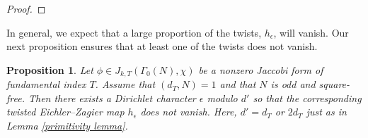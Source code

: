 \documentclass[11pt]{article}
\newtheorem{proposition}[theorem]{Proposition}
\theoremstyle{definition}
\theoremstyle{remark}
\newcommand{\Z}{\mathbb{Z}}
\begin{document}
\begin{proof}







\end{proof}

In general, we expect that a large proportion of the twists, $h_\epsilon$, will vanish. Our next proposition ensures that at least one of the twists does not vanish. 

\begin{proposition} \label{nonvanishing of twist}
    Let $\phi \in J_{k,T}(\Gamma_0(N),\chi)$ be a nonzero Jaccobi form of fundamental index $T$. Assume that $(d_T,N) = 1$ and that $N$ is odd and square-free. Then there exists a Dirichlet character $\epsilon$ modulo $d'$ so that the corresponding twisted Eichler--Zagier map $h_\epsilon$ does not vanish. Here, $d' = d_T$ or $2d_T$ just as in Lemma \ref{primitivity lemma}.
\end{proposition}
\end{document}
